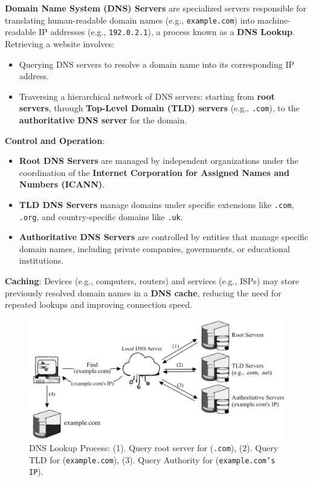 \begin{Def}

    \textbf{Domain Name System (DNS) Servers} are specialized servers responsible for translating human-readable domain names (e.g., \texttt{example.com}) into machine-readable IP addresses (e.g., \texttt{192.0.2.1}),
    a process known as a \textbf{DNS Lookup}. Retrieving a website involves:
    \begin{itemize}
        \item Querying DNS servers to resolve a domain name into its corresponding IP address.
        \item Traversing a hierarchical network of DNS servers: starting from \textbf{root servers}, through \textbf{Top-Level Domain (TLD) servers} (e.g., \texttt{.com}), to the \textbf{authoritative DNS server} for the domain.
    \end{itemize}
    
    \noindent
    \textbf{Control and Operation}:
    \begin{itemize}
        \item \textbf{Root DNS Servers} are managed by independent organizations under the coordination of the \textbf{Internet Corporation for Assigned Names and Numbers (ICANN)}.
        \item \textbf{TLD DNS Servers} manage domains under specific extensions like \texttt{.com}, \texttt{.org}, and country-specific domains like \texttt{.uk}.
        \item \textbf{Authoritative DNS Servers} are controlled by entities that manage specific domain names, including private companies, governments, or educational institutions.
    \end{itemize}
    
    \noindent
    \textbf{Caching}: Devices (e.g., computers, routers) and services (e.g., ISPs) may store previously resolved domain names in a \textbf{DNS cache}, reducing the need for repeated lookups and improving connection speed. \hfill \cite{rfc1034}
    
    
\end{Def}

\newpage

\begin{figure}[h!]
    \hspace{-2.5em}
    \includegraphics[width=1.1\textwidth]{Sections/network/dns.png}
    \caption{DNS Lookup Process: (1). Query root server for (\texttt{.com}), (2). Query TLD for (\texttt{example.com}), (3). Query Authority for (\texttt{example.com's IP}).}
    \label{fig:dns}
\end{figure}

